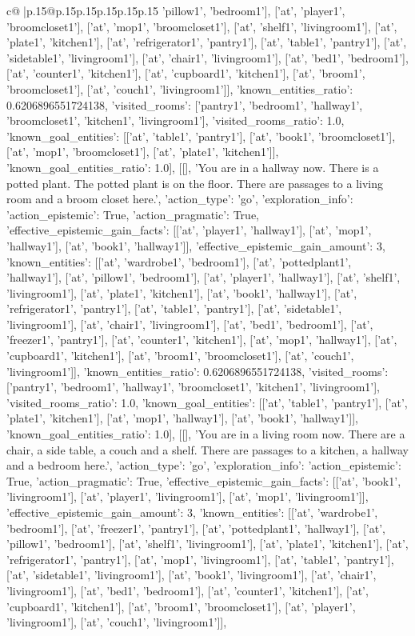\documentclass{article}
\begin{document}
{\begin{supertabular}{c@{$\;$}|p{.15\linewidth}@{}p{.15\linewidth}p{.15\linewidth}p{.15\linewidth}p{.15\linewidth}p{.15\linewidth}}
{{{'pillow1', 'bedroom1'], ['at', 'player1', 'broomcloset1'], ['at', 'mop1', 'broomcloset1'], ['at', 'shelf1', 'livingroom1'], ['at', 'plate1', 'kitchen1'], ['at', 'refrigerator1', 'pantry1'], ['at', 'table1', 'pantry1'], ['at', 'sidetable1', 'livingroom1'], ['at', 'chair1', 'livingroom1'], ['at', 'bed1', 'bedroom1'], ['at', 'counter1', 'kitchen1'], ['at', 'cupboard1', 'kitchen1'], ['at', 'broom1', 'broomcloset1'], ['at', 'couch1', 'livingroom1']], 'known_entities_ratio': 0.6206896551724138, 'visited_rooms': ['pantry1', 'bedroom1', 'hallway1', 'broomcloset1', 'kitchen1', 'livingroom1'], 'visited_rooms_ratio': 1.0, 'known_goal_entities': [['at', 'table1', 'pantry1'], ['at', 'book1', 'broomcloset1'], ['at', 'mop1', 'broomcloset1'], ['at', 'plate1', 'kitchen1']], 'known_goal_entities_ratio': 1.0}}], [[], 'You are in a hallway now. There is a potted plant. The potted plant is on the floor. There are passages to a living room and a broom closet here.', {'action_type': 'go', 'exploration_info': {'action_epistemic': True, 'action_pragmatic': True, 'effective_epistemic_gain_facts': [['at', 'player1', 'hallway1'], ['at', 'mop1', 'hallway1'], ['at', 'book1', 'hallway1']], 'effective_epistemic_gain_amount': 3, 'known_entities': [['at', 'wardrobe1', 'bedroom1'], ['at', 'pottedplant1', 'hallway1'], ['at', 'pillow1', 'bedroom1'], ['at', 'player1', 'hallway1'], ['at', 'shelf1', 'livingroom1'], ['at', 'plate1', 'kitchen1'], ['at', 'book1', 'hallway1'], ['at', 'refrigerator1', 'pantry1'], ['at', 'table1', 'pantry1'], ['at', 'sidetable1', 'livingroom1'], ['at', 'chair1', 'livingroom1'], ['at', 'bed1', 'bedroom1'], ['at', 'freezer1', 'pantry1'], ['at', 'counter1', 'kitchen1'], ['at', 'mop1', 'hallway1'], ['at', 'cupboard1', 'kitchen1'], ['at', 'broom1', 'broomcloset1'], ['at', 'couch1', 'livingroom1']], 'known_entities_ratio': 0.6206896551724138, 'visited_rooms': ['pantry1', 'bedroom1', 'hallway1', 'broomcloset1', 'kitchen1', 'livingroom1'], 'visited_rooms_ratio': 1.0, 'known_goal_entities': [['at', 'table1', 'pantry1'], ['at', 'plate1', 'kitchen1'], ['at', 'mop1', 'hallway1'], ['at', 'book1', 'hallway1']], 'known_goal_entities_ratio': 1.0}}], [[], 'You are in a living room now. There are a chair, a side table, a couch and a shelf. There are passages to a kitchen, a hallway and a bedroom here.', {'action_type': 'go', 'exploration_info': {'action_epistemic': True, 'action_pragmatic': True, 'effective_epistemic_gain_facts': [['at', 'book1', 'livingroom1'], ['at', 'player1', 'livingroom1'], ['at', 'mop1', 'livingroom1']], 'effective_epistemic_gain_amount': 3, 'known_entities': [['at', 'wardrobe1', 'bedroom1'], ['at', 'freezer1', 'pantry1'], ['at', 'pottedplant1', 'hallway1'], ['at', 'pillow1', 'bedroom1'], ['at', 'shelf1', 'livingroom1'], ['at', 'plate1', 'kitchen1'], ['at', 'refrigerator1', 'pantry1'], ['at', 'mop1', 'livingroom1'], ['at', 'table1', 'pantry1'], ['at', 'sidetable1', 'livingroom1'], ['at', 'book1', 'livingroom1'], ['at', 'chair1', 'livingroom1'], ['at', 'bed1', 'bedroom1'], ['at', 'counter1', 'kitchen1'], ['at', 'cupboard1', 'kitchen1'], ['at', 'broom1', 'broomcloset1'], ['at', 'player1', 'livingroom1'], ['at', 'couch1', 'livingroom1']], }}}
\end{supertabular}}
\end{document}
